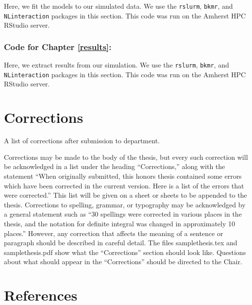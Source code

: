 \documentclass[12pt, twoside]{amherstthesis}
\begin{document}
Here, we fit the models to our simulated data. We use the \texttt{rslurm}, \texttt{bkmr}, and \texttt{NLinteraction} packages in this section. This code was run on the Amherst HPC RStudio server.

\hypertarget{code-for-chapter-refresults}{%
\subsection{Code for Chapter \ref{results}:}\label{code-for-chapter-refresults}}

Here, we extract results from our simulation. We use the \texttt{rslurm}, \texttt{bkmr}, and \texttt{NLinteraction} packages in this section. This code was run on the Amherst HPC RStudio server.

\hypertarget{corrections}{%
\chapter*{Corrections}\label{corrections}}

A list of corrections after submission to department.

Corrections may be made to the body of the thesis, but every such correction will be acknowledged in a list under the heading ``Corrections,'' along with the statement ``When originally submitted, this honors thesis contained some errors which have been corrected in the current version. Here is a list of the errors that were corrected.'' This list will be given on a sheet or sheets to be appended to the thesis. Corrections to spelling, grammar, or typography may be acknowledged by a general statement such as ``30 spellings were corrected in various places in the thesis, and the notation for definite integral was changed in approximately 10 places.'' However, any correction that affects the meaning of a sentence or paragraph should be described in careful detail. The files samplethesis.tex and samplethesis.pdf show what the ``Corrections'' section should look like. Questions about what should appear in the ``Corrections'' should be directed to the Chair.

\backmatter

\hypertarget{references}{%
\chapter*{References}\label{references}}

\noindent
\end{document}
